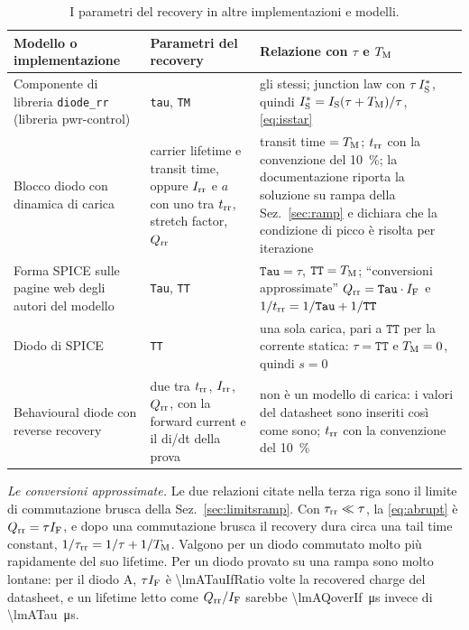 \documentclass[10pt,a4paper]{scrartcl}
\let\newcommand\pdvaluedefine
\newcommand{\IF}{I_\mathrm{F}}
\newcommand{\Irr}{I_\mathrm{rr}}
\newcommand{\Qrr}{Q_\mathrm{rr}}
\newcommand{\trr}{t_\mathrm{rr}}
\newcommand{\taurr}{\tau_\mathrm{rr}}
\newcommand{\TM}{T_\mathrm{M}}
\newcommand{\IS}{I_\mathrm{S}}
\begin{document}
\begin{table}[htb]
\centering\small
\caption{I parametri del recovery in altre implementazioni e modelli.}
\label{tab:others}
\begin{tabular}{@{}p{4.6cm}p{4.2cm}p{7.2cm}@{}}
\toprule
Modello o implementazione & Parametri del recovery & Relazione con $\tau$ e $\TM$ \\
\midrule
Componente di libreria \texttt{diode\_rr} (libreria pwr-control) & \texttt{tau}, \texttt{TM} & gli stessi; junction law con $\tau\,\IS^{*}$, quindi $\IS^{*} = \IS(\tau+\TM)/\tau$, \eqref{eq:isstar} \\
\addlinespace
Blocco diodo con dinamica di carica \cite{mathworks} & carrier lifetime e transit time, oppure $\Irr$ e $a$ con uno tra $\trr$, stretch factor, $\Qrr$ & transit time $= \TM$; $\trr$ con la convenzione del \SI{10}{\percent}; la documentazione riporta la soluzione su rampa della Sez.~\ref{sec:ramp} e dichiara che la condizione di picco è risolta per iterazione \\
\addlinespace
Forma SPICE sulle pagine web degli autori del modello \cite{pemodels} & \texttt{Tau}, \texttt{TT} & $\texttt{Tau} = \tau$, $\texttt{TT} = \TM$; ``conversioni approssimate'' $\Qrr = \texttt{Tau}\cdot\IF$ e $1/\trr = 1/\texttt{Tau} + 1/\texttt{TT}$ \\
\addlinespace
Diodo di SPICE & \texttt{TT} & una sola carica, pari a $\texttt{TT}$ per la corrente statica: $\tau = \texttt{TT}$ e $\TM = 0$, quindi $s = 0$ \\
\addlinespace
Behavioural diode con reverse recovery \cite{plecs} & due tra $\trr$, $\Irr$, $\Qrr$, con la forward current e il di/dt della prova & non è un modello di carica: i valori del datasheet sono inseriti così come sono; $\trr$ con la convenzione del \SI{10}{\percent} \\
\bottomrule
\end{tabular}
\end{table}

\emph{Le conversioni approssimate.} Le due relazioni citate nella terza riga sono il limite di commutazione brusca della Sez.~\ref{sec:limitsramp}. Con $\taurr \ll \tau$, la \eqref{eq:abrupt} è $\Qrr = \tau\IF$, e dopo una commutazione brusca il recovery dura circa una tail time constant, $1/\taurr = 1/\tau + 1/\TM$. Valgono per un diodo commutato molto più rapidamente del suo lifetime. Per un diodo provato su una rampa sono molto lontane: per il diodo A, $\tau\IF$ è \num{\lmATauIfRatio} volte la recovered charge del datasheet, e un lifetime letto come $\Qrr/\IF$ sarebbe \SI{\lmAQoverIf}{\micro\second} invece di \SI{\lmATau}{\micro\second}.
\end{document}
